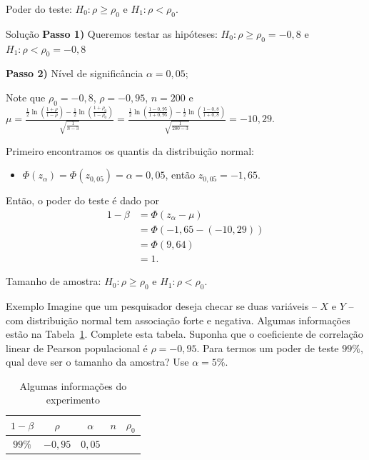 \documentclass[9pt]{beamer}
\begin{document}
\begin{frame}{Poder do teste: $H_0:\rho \geq \rho_0$ e $H_1: \rho < \rho_0$.}

\begin{block}{Solução}
	\textbf{Passo 1)} Queremos testar as hipóteses: $H_0: \rho \geq \rho_0 = -0,8$ e $H_1:  \rho < \rho_0 = -0,8$
	
	\textbf{Passo 2)} Nível de significância $\alpha = 0,05$;
	
	Note que $\rho_0=-0,8$, $\rho=-0,95$, $n=200$ e $\mu = \frac{\frac{1}{2} \ln \left( \frac{1 + \rho}{1 - \rho} \right) - \frac{1}{2} \ln \left( \frac{1 + \rho_0}{1 - \rho_0} \right)}{\sqrt{\frac{1}{n-3}}}= \allowbreak \frac{\frac{1}{2} \ln \left( \frac{1 - 0,95}{1 + 0,95} \right) - \frac{1}{2} \ln \left( \frac{1 -0,8}{1 + 0,8} \right)}{\sqrt{\frac{1}{200-3}}} = -10,29$.
	
	Primeiro encontramos os quantis da distribuição normal:
	\begin{itemize}
		\item $\Phi\left(z_{\alpha}\right) = \Phi\left(z_{0,05}\right) = \alpha = 0,05$, então $z_{0,05} = -1,65$.
	\end{itemize}

	Então, o poder do teste é dado por
	\begin{align*}
		1 - \beta &= \Phi\left( z_\alpha - \mu \right)\\
		&= \Phi\left( -1,65 - (-10,29) \right)\\
		&= \Phi(9,64)\\
		&= 1.
	\end{align*}
\end{block}

\end{frame}

\begin{frame}{Tamanho de amostra: $H_0:\rho \geq \rho_0$ e $H_1: \rho < \rho_0$.}

\begin{block}{Exemplo}
	Imagine que um pesquisador deseja checar se duas variáveis -- $X$ e $Y$ -- com distribuição normal tem associação forte e negativa. Algumas informações estão na Tabela~\ref{tab:experimento-test-rho-samp-size}. Complete esta tabela. Suponha que o coeficiente de correlação linear de Pearson populacional é $\rho=-0,95$. Para termos um poder de teste $99\%$, qual deve ser o tamanho da amostra? Use $\alpha=5\%$.
	
	\begin{table}[ht]
		\centering
		\begin{tabular}{c|c|c|c|c}
			\toprule[0.05cm]
			$1-\beta$ & $\rho$ & $\alpha$ & $n$ & $\rho_0$ \\
			\midrule
		 $99\%$	& $-0,95$ & $0,05$ &   &   \\ \bottomrule[0.05cm]
		\end{tabular}
		\caption{Algumas informações do experimento} 
		\label{tab:experimento-test-rho-samp-size}
	\end{table}
\end{block}

\end{frame}
\end{document}
